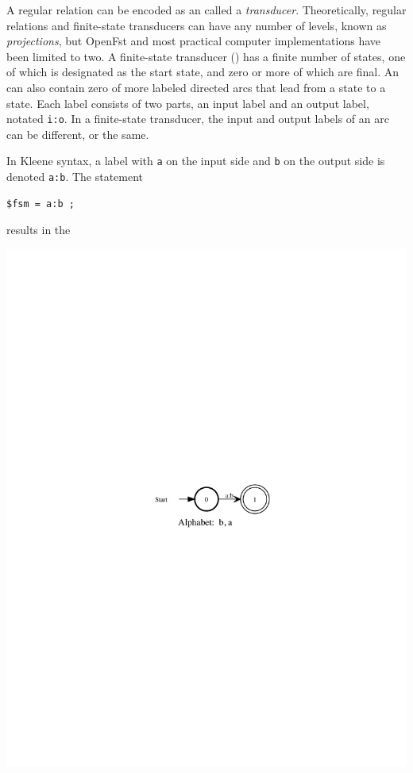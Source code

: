 A regular relation can be encoded as an \fsm{} called a \emph{transducer}.  Theoretically,
regular relations and finite-state transducers can have any number of levels, known as
\emph{projections}, but OpenFst and most practical computer implementations have been limited to two.
A finite-state transducer (\fst{}) has a finite number of states, one of which is
designated as the start state, and zero or more of which are final.  An \fst{} can also
contain zero of more labeled directed arcs that lead from a state to a state.  Each label
consists of two parts, an input label and an output label, notated  \verb!i:o!.  In a finite-state
transducer, the input
and output labels of an arc can be different, or the same.

In Kleene syntax, a label with \texttt{a} on the input side and \texttt{b} on the output
side is denoted \texttt{a:b}.  The statement


\begin{Verbatim}
$fsm = a:b ;
\end{Verbatim}

\noindent
results in the \fst{}


\begin{center}
\includegraphics{images/aoverb.pdf}
\end{center}


